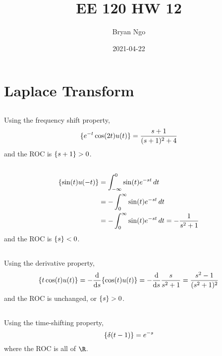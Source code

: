 \documentclass{article}
\title{EE 120 HW 12}
\author{Bryan Ngo}
\date{2021-04-22}
\let\L\relax
\DeclareMathOperator{\L}{\mathcal{L}}
\let\Re\relax
\DeclareMathOperator{\Re}{\mathfrak{R}}
\begin{document}
\maketitle

\section{Laplace Transform}

\subsection{}

Using the frequency shift property,
\begin{equation}
    \L\{e^{-t} \cos(2t) u(t)\} = \frac{s + 1}{(s + 1)^2 + 4}
\end{equation}
and the ROC is \(\Re\{s + 1\} > 0\).

\subsection{}

\begin{align}
    \L\{\sin(t) u(-t)\} &= \int_{-\infty}^0 \sin(t) e^{-st} \, dt \\
    &= -\int_0^\infty \sin(t) e^{-st} \, dt \\
    &= -\int_0^\infty \sin(t) e^{-st} \, dt = -\frac{1}{s^2 + 1}
\end{align}
and the ROC is \(\Re\{s\} < 0\).

\subsection{}

Using the derivative property,
\begin{equation}
    \L\{t \cos(t) u(t)\} = -\dv{s} \L\{\cos(t) u(t)\} = -\dv{s} \frac{s}{s^2 + 1} = \frac{s^2 - 1}{(s^2 + 1)^2}
\end{equation}
and the ROC is unchanged, or \(\Re\{s\} > 0\).

\subsection{}

Using the time-shifting property,
\begin{equation}
    \L\{\delta(t - 1)\} = e^{-s}
\end{equation}
where the ROC is all of \(\R\).
\end{document}
